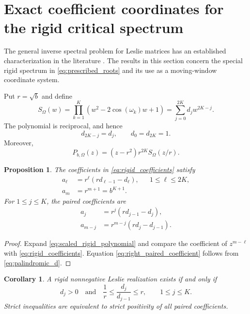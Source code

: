 \documentclass[11pt]{amsart}
\numberwithin{equation}{section}
\theoremstyle{plain}
\newtheorem{proposition}[theorem]{Proposition}
\newtheorem{corollary}[theorem]{Corollary}
\theoremstyle{definition}
\theoremstyle{remark}
\begin{document}
\section{Exact coefficient coordinates for the rigid critical spectrum}
\label{sec:eta_coordinates}

The general inverse spectral problem for Leslie matrices has an established characterization in the literature \cite{Benvenuti2019}.  The results in this section concern the special rigid spectrum in \eqref{eq:prescribed_roots} and its use as a moving-window coordinate system.

Put $r=\sqrt b$ and define
\begin{equation}
S_\Omega(w)
=\prod_{k=1}^{K}\left(w^2-2\cos(\omega_k)w+1\right)
=\sum_{j=0}^{2K}d_jw^{2K-j}.
\label{eq:unit_circle_factor}
\end{equation}
The polynomial is reciprocal, and hence
\begin{equation}
d_{2K-j}=d_j,
\qquad
d_0=d_{2K}=1.
\label{eq:palindromic_d}
\end{equation}
Moreover,
\begin{equation}
P_{b,\Omega}(z)
=(z-r^2)r^{2K}S_\Omega(z/r).
\label{eq:scaled_rigid_polynomial}
\end{equation}

\begin{proposition}
\label{prop:coefficient_formula}
The coefficients in \eqref{eq:rigid_coefficients} satisfy
\begin{align}
a_\ell
&=r^\ell\left(rd_{\ell-1}-d_\ell\right),
&&1\leq\ell\leq2K,
\label{eq:coefficient_formula_main}\\
a_m&=r^{m+1}=b^{K+1}.
\label{eq:last_coefficient_fixed}
\end{align}
For $1\leq j\leq K$, the paired coefficients are
\begin{align}
a_j
&=r^j\left(rd_{j-1}-d_j\right),
\label{eq:left_paired_coefficient}\\
a_{m-j}
&=r^{m-j}\left(rd_j-d_{j-1}\right).
\label{eq:right_paired_coefficient}
\end{align}
\end{proposition}

\begin{proof}
Expand \eqref{eq:scaled_rigid_polynomial} and compare the coefficient of $z^{m-\ell}$ with \eqref{eq:rigid_coefficients}.  Equation \eqref{eq:right_paired_coefficient} follows from \eqref{eq:palindromic_d}.
\end{proof}

\begin{corollary}
\label{cor:ratio_test}
A rigid nonnegative Leslie realization exists if and only if
\begin{equation}
d_j>0
\quad\text{and}\quad
\frac1r\leq\frac{d_j}{d_{j-1}}\leq r,
\qquad 1\leq j\leq K.
\label{eq:ratio_test}
\end{equation}
Strict inequalities are equivalent to strict positivity of all paired coefficients.
\end{corollary}
\end{document}
